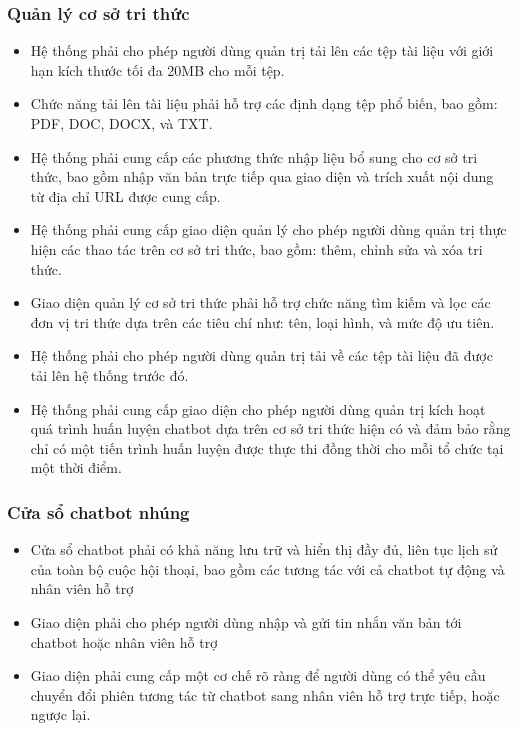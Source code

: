 \subsubsection{Quản lý cơ sở tri thức}
\begin{itemize}
    \item Hệ thống phải cho phép người dùng quản trị tải lên các tệp tài liệu với giới hạn kích thước tối đa 20MB cho mỗi tệp.
    \item Chức năng tải lên tài liệu phải hỗ trợ các định dạng tệp phổ biến, bao gồm: PDF, DOC, DOCX, và TXT.
    \item Hệ thống phải cung cấp các phương thức nhập liệu bổ sung cho cơ sở tri thức, bao gồm nhập văn bản trực tiếp qua giao diện và trích xuất nội dung từ địa chỉ URL được cung cấp.
    \item Hệ thống phải cung cấp giao diện quản lý cho phép người dùng quản trị thực hiện các thao tác trên cơ sở tri thức, bao gồm: thêm, chỉnh sửa và xóa tri thức.
    \item Giao diện quản lý cơ sở tri thức phải hỗ trợ chức năng tìm kiếm và lọc các đơn vị tri thức dựa trên các tiêu chí như: tên, loại hình, và mức độ ưu tiên.
    \item Hệ thống phải cho phép người dùng quản trị tải về các tệp tài liệu đã được tải lên hệ thống trước đó.
    \item Hệ thống phải cung cấp giao diện cho phép người dùng quản trị kích hoạt quá trình huấn luyện chatbot dựa trên cơ sở tri thức hiện có và đảm bảo rằng chỉ có một tiến trình huấn luyện được thực thi đồng thời cho mỗi tổ chức tại một thời điểm.
\end{itemize}

\subsubsection{Cửa sổ chatbot nhúng}
\begin{itemize}
    \item Cửa sổ chatbot phải có khả năng lưu trữ và hiển thị đầy đủ, liên tục lịch sử của toàn bộ cuộc hội thoại, bao gồm các tương tác với cả chatbot tự động và nhân viên hỗ trợ
    \item Giao diện phải cho phép người dùng nhập và gửi tin nhắn văn bản tới chatbot hoặc nhân viên hỗ trợ
    \item Giao diện phải cung cấp một cơ chế rõ ràng để người dùng có thể yêu cầu chuyển đổi phiên tương tác từ chatbot sang nhân viên hỗ trợ trực tiếp, hoặc ngược lại.
\end{itemize}

